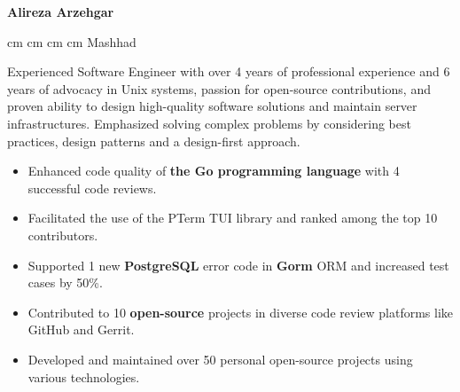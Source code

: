 \documentclass{engineercv}
\begin{document}
\begin{center}
  \textbf{\fontsize{24 pt}{24 pt}\selectfont Alireza Arzehgar}

  \vspace{0.2 cm}

  \scriptsize
  \mbox{}
   cm
  \mbox{}
   cm
  \mbox{}
   cm
  \mbox{}
   cm
  \mbox{{\color{black}\footnotesize\faMapMarker*}\hspace*{0.13cm}Mashhad}
\end{center}


Experienced Software Engineer with over 4 years of professional experience and 6 years of advocacy in Unix systems,
passion for open-source contributions, and proven ability to design high-quality software solutions and
maintain server infrastructures. Emphasized solving complex problems by considering best practices,
design patterns and a design-first approach.

\begin{itemize}
  \item Enhanced code quality of \textbf{the Go programming language} with 4 successful code reviews.
  \item Facilitated the use of the PTerm TUI library and ranked among the top 10 contributors.
  \item Supported 1 new \textbf{PostgreSQL} error code in \textbf{Gorm} ORM and increased test cases by 50\%.
  \item Contributed to 10 \textbf{open-source} projects in diverse code review platforms like GitHub and Gerrit.
  \item Developed and maintained over 50 personal open-source projects using various technologies.
\end{itemize}
\end{document}
